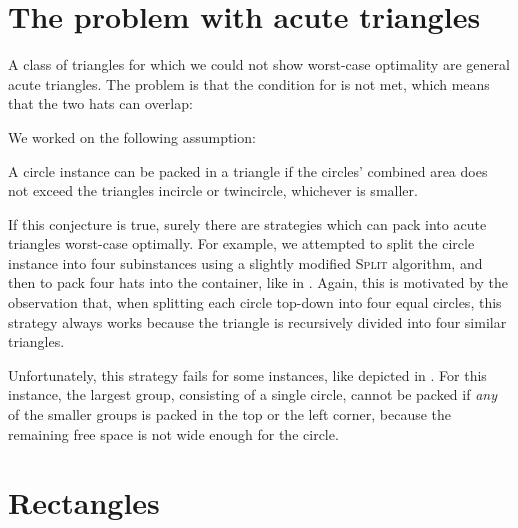 \documentclass[a4paper,style=print,oneside,bibliography=totoc,nexus,lnum,extramargin]{tubsbook}
\begin{document}
%
%

\section{The problem with acute triangles}\label{sec:acute-triangles}

A class of triangles for which we could not show worst-case optimality are general acute triangles. The problem is that the condition for  is not met, which means that the two hats can overlap:


We worked on the following assumption:

\begin{conjecture}
    A circle instance can be packed in a triangle if the circles' combined area does not exceed the triangles incircle or twincircle, whichever is smaller.
\end{conjecture}

If this conjecture is true, surely there are strategies which can pack into acute triangles worst-case optimally. For example, we attempted to split the circle instance into four subinstances using a slightly modified \textsc{Split} algorithm, and then to pack four hats into the container, like in . Again, this is motivated by the observation that, when splitting each circle top-down into four equal circles, this strategy always works because the triangle is recursively divided into four similar triangles.


Unfortunately, this strategy fails for some instances, like depicted in . For this instance, the largest group, consisting of a single circle, cannot be packed if \emph{any} of the smaller groups is packed in the top or the left corner, because the remaining free space is not wide enough for the circle.


\section{Rectangles}\label{sec:rectangles}
\end{document}
